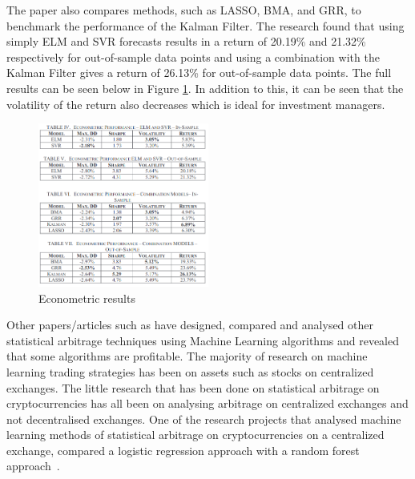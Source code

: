 \noindent The paper also compares methods, such as LASSO, BMA, and GRR, to benchmark the performance of the Kalman Filter. The research found that using simply ELM and SVR forecasts results in a return of 20.19\% and 21.32\% respectively for out-of-sample data points and using a combination with the Kalman Filter gives a return of 26.13\% for out-of-sample data points. The full results can be seen below in Figure \ref{fig:kalman_ml_results}. In addition to this, it can be seen that the volatility of the return also decreases which is ideal for investment managers.
\begin{figure}[htb!]
    \centering
    \includegraphics[width=0.5\textwidth]{background/Images/kalman_ml_results.png}
    \caption{Econometric results~\cite{6974093}}
    \label{fig:kalman_ml_results}
\end{figure}

\noindent Other papers/articles such as \cite{KRAUSS2017689, alma991000475380901591, jrfm12010031} have designed, compared and analysed other statistical arbitrage techniques using Machine Learning algorithms and revealed that some algorithms are profitable. The majority of research on machine learning trading strategies has been on assets such as stocks on centralized exchanges. The little research that has been done on statistical arbitrage on cryptocurrencies has all been on analysing arbitrage on centralized exchanges and not decentralised exchanges. One of the research projects that analysed machine learning methods of statistical arbitrage on cryptocurrencies on a centralized exchange, compared a logistic regression approach with a random forest approach~\cite{jrfm12010031}. 


